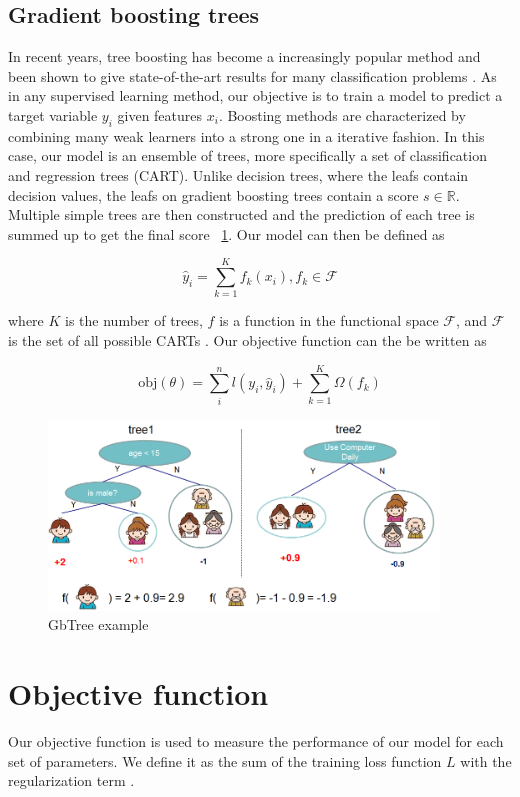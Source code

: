 \documentclass[cic,tc,english]{iiufrgs}
\begin{document}
\subsection{Gradient boosting trees}
In recent years, tree boosting has become a increasingly popular method and been shown to give state-of-the-art results for many classification problems \cite{Li2012}. As in any supervised learning method, our objective is to train a model to predict a target variable \(y_i\) given features \(x_i\). Boosting methods are characterized by combining many weak learners into a strong one in a iterative fashion. In this case, our model is an ensemble of trees, more specifically a set of classification and regression trees (CART). Unlike decision trees, where the leafs contain decision values, the leafs on gradient boosting trees contain a score \(s \in \mathbb{R}\). Multiple simple trees are then constructed and the prediction of each tree is summed up to get the final score ~\ref{fig:ex1}. Our model can then be defined as

$$\hat{y}_i = \sum_{k=1}^K f_k(x_i), f_k \in \mathcal{F}$$

where \(K\) is the number of trees, \(f\) is a function in the functional space $\mathcal{F}$, and $\mathcal{F}$ is the set of all possible CARTs \cite{Chen2016}. Our objective function can the be written as

$$\text{obj}(\theta) = \sum_i^n l(y_i, \hat{y}_i) + \sum_{k=1}^K \Omega(f_k)$$

\begin{figure}
    \caption{GbTree example}
    \begin{center}
        \includegraphics[width=28em]{twocart}
    \end{center}
    \label{fig:ex1}
\end{figure}

\section{Objective function}
Our objective function is used to measure the performance of our model for each set of parameters. We define it as the sum of the training loss function \(L\) with the regularization term \Omega.
\end{document}
